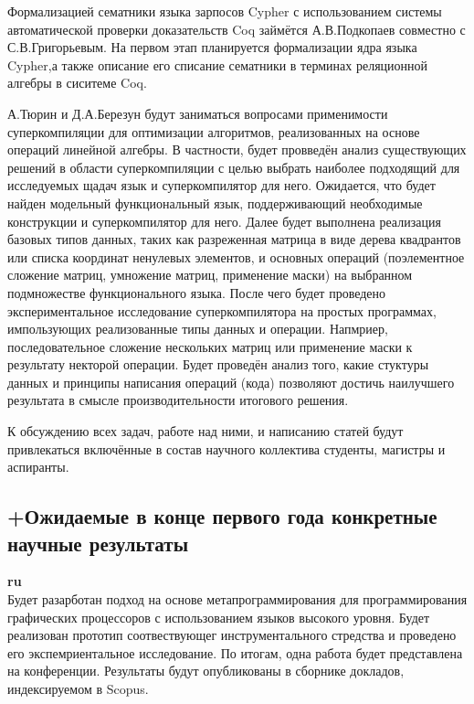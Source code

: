 \documentclass[12pt]{article}  %
\theoremstyle{remark}
\begin{document}
Формализацией сематники языка зарпосов Cypher с использованием системы автоматической проверки доказательств Coq займётся А.В.Подкопаев совместно с С.В.Григорьевым. На первом этап планируется формализации ядра языка Cypher,а также описание его списание сематники в терминах реляционной алгебры в сиситеме Coq.

А.Тюрин и Д.А.Березун будут заниматься вопросами применимости суперкомпиляции для оптимизации алгоритмов, реализованных на основе операций линейной алгебры. В частности, будет провведён анализ существующих решений в области суперкомпиляции с целью выбрать наиболее подходящий для исследуемых щадач язык и суперкомпилятор для него. Ожидается, что будет найден модельный функциональный язык, поддерживающий необходимые конструкции и суперкомпилятор для него. Далее будет выполнена реализация базовых типов данных, таких как разреженная матрица в виде дерева квадрантов или списка координат ненулевых элементов, и основных операций (поэлементное сложение матриц, умножение матриц, применение маски) на выбранном подмножестве функционального языка.
После чего будет проведено экспериментальное исследование суперкомпилятора на простых программах, импользующих реализованные типы данных и операции. Напмриер, последовательное сложение нескольких матриц или применение маски к результату некторой операции. Будет проведён анализ того, какие стуктуры данных и принципы написания операций (кода) позволяют достичь наилучшего результата в смысле производительности итогового решения. 

К обсуждению всех задач, работе над ними, и написанию статей будут привлекаться включённые в состав научного коллектива студенты, магистры и аспиранты.

\subsection{+Ожидаемые в конце первого года конкретные научные результаты}

\textbf{ru}\\

Будет разарботан подход на основе метапрограммирования для программирования графических процессоров с использованием языков высокого уровня. Будет реализован прототип соотвествующег инструментального стредства и проведено его экспемриентальное исследование. По итогам, одна работа будет представлена на конференции. Результаты будут опубликованы в сборнике докладов, индексируемом в Scopus.
\end{document}
